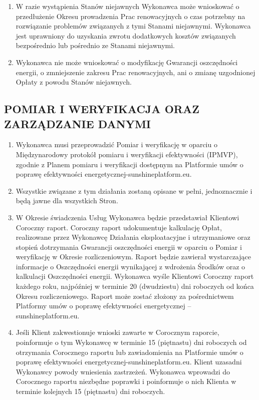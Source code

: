 \begin{multicols}{2}
\begin{enumerate}
	\item W razie wystąpienia Stanów niejawnych Wykonawca może wnioskować o przedłużenie Okresu prowadzenia Prac renowacyjnych o czas potrzebny na rozwiązanie problemów związanych z tymi Stanami niejawnymi. Wykonawca jest uprawniony do uzyskania zwrotu dodatkowych kosztów związanych bezpośrednio lub pośrednio ze Stanami niejawnymi.
	\item Wykonawca nie może wnioskować o modyfikację Gwarancji oszczędności energii, o zmniejszenie zakresu Prac renowacyjnych, ani o zmianę uzgodnionej Opłaty z powodu Stanów niejawnych.
\end{enumerate}

\subsection{POMIAR I WERYFIKACJA ORAZ ZARZĄDZANIE DANYMI}
\begin{enumerate}
	\item Wykonawca musi przeprowadzić Pomiar i weryfikację w oparciu o Międzynarodowy protokół pomiaru i weryfikacji efektywności (IPMVP), zgodnie z Planem pomiaru i weryfikacji dostępnym na Platformie umów o poprawę efektywności energetycznej-sunshineplatform.eu.
	\item Wszystkie związane z tym działania zostaną opisane w pełni, jednoznacznie i będą jawne dla wszystkich Stron.
	\item W Okresie świadczenia Usług Wykonawca będzie przedstawiał Klientowi Coroczny raport. Coroczny raport udokumentuje kalkulację Opłat, realizowane przez Wykonawcę Działania eksploatacyjne i utrzymaniowe oraz stopień dotrzymania Gwarancji oszczędności energii w oparciu o Pomiar i weryfikację w Okresie rozliczeniowym. Raport będzie zawierał wystarczające informacje o Oszczędności energii wynikającej z wdrożenia Środków oraz o kalkulacji Oszczędności energii. Wykonawca wyśle Klientowi Coroczny raport każdego roku, najpóźniej w terminie 20 (dwudziestu) dni roboczych od końca Okresu rozliczeniowego. Raport może zostać złożony za pośrednictwem Platformy umów o poprawę efektywności energetycznej – sunshineplatform.eu.
	\item Jeśli Klient zakwestionuje wnioski zawarte w Corocznym raporcie, poinformuje o tym Wykonawcę w terminie 15 (piętnastu) dni roboczych od otrzymania Corocznego raportu lub zawiadomienia na Platformie umów o poprawę efektywności energetycznej-sunshineplatform.eu. Klient uzasadni Wykonawcy powody wniesienia zastrzeżeń. Wykonawca wprowadzi do Corocznego raportu niezbędne poprawki i poinformuje o nich Klienta w terminie kolejnych 15 (piętnastu) dni roboczych.

\end{enumerate}
\end{multicols}

